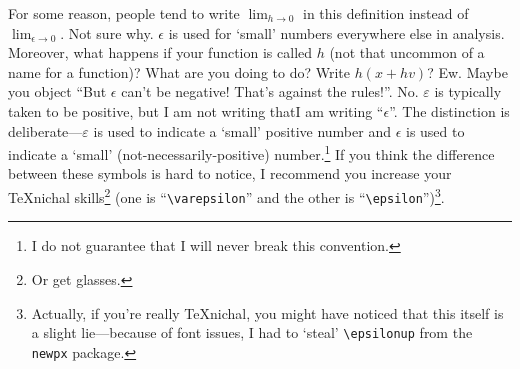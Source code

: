 \begin{dfn}
\begin{savenotes}
\begin{rmk}
For some reason, people tend to write $\lim _{h\to 0}$ in this definition instead of $\lim _{\epsilon \to 0}$.  Not sure why.  $\epsilon$ is used for `small' numbers everywhere else in analysis.  Moreover, what happens if your function is called $h$ (not that uncommon of a name for a function)?  What are you doing to do?  Write $h(x+hv)$?  Ew.  Maybe you object ``But $\epsilon$ can't be negative!  That's against the rules!''.  No.  $\varepsilon$ is typically taken to be positive, but I am not writing that\textellipsis I am writing ``$\epsilon$''.  The distinction is deliberate---$\varepsilon$ is used to indicate a `small' positive number and $\epsilon$ is used to indicate a `small' (not-necessarily-positive) number.\footnote{I do not guarantee that I will never break this convention.}  If you think the difference between these symbols is hard to notice, I recommend you increase your \TeX nichal skills\footnote{Or get glasses.} (one is ``\texttt{\textbackslash varepsilon}'' and the other is ``\texttt{\textbackslash epsilon}'')\footnote{Actually, if you're really \TeX nichal, you might have noticed that this itself is a slight lie---because of font issues, I had to `steal' \texttt{\textbackslash epsilonup} from the \texttt{newpx} package.}.
\end{rmk}
\end{savenotes}
\end{dfn}
